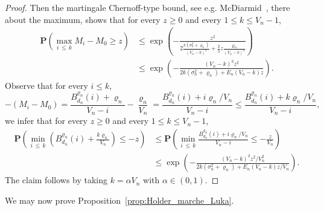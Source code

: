 \documentclass[AHL,Unicode,longabstracts,published]{cedram}
\newcommand{\ensembles}[1]{\mathbf{#1}}
\renewcommand{\P}{\ensembles{P}}
\renewcommand{\Pr}[1]{\P\left(#1\right)}
\newcommand{\1}{\ensembles{1}}
\renewcommand{\le}{\leqslant}
\renewcommand{\ge}{\geqslant}
\newcommand{\Bfn}{B_{d_n}^{\varrho_n}}
\newcommand{\edges}{E}
\newcommand{\vertices}{V}
\begin{document}
\begin{proof}
Then the martingale Chernoff-type bound, see e.g. McDiarmid~\cite[Theorem~3.15 and the remark at the end of Section~3.5]{McD98}, there about the maximum, shows that for every $z \ge 0$ and every $1 \le k \le \vertices_n-1$,
\begin{align*}
\Pr{\max_{i\,\le\,k} M_i - M_0 \ge z} &\le \exp\left(- \frac{z^2}{2 \frac{k \left(\sigma_n^2+\varrho_n\right)}{\left(\vertices_n - k\right)^3} + \frac{2}{3} z \frac{\edges_n}{\left(\vertices_n - k\right)^2}}\right)
\\
&\le \exp\left(- \frac{\left(\vertices_n - k\right)^3 z^2}{2k \left(\sigma_n^2+\varrho_n\right) + \edges_n (\vertices_n-k) z}\right).
\end{align*}
Observe that for every $i \le k$,
\[
- \left(M_i - M_0\right) = \frac{\Bfn(i) + \varrho_n}{\vertices_n-i} - \frac{\varrho_n}{\vertices_n} = \frac{\Bfn(i) + i \varrho_n / \vertices_n}{\vertices_n-i}
\le \frac{\Bfn(i) + k \varrho_n / \vertices_n}{\vertices_n-i},
\]
we infer that for every $z \ge 0$ and every $1 \le k \le \vertices_n-1$,
\begin{align*}
\Pr{\min_{i\,\le\,k} \left(\Bfn(i) + \frac{k \varrho_n}{\vertices_n}\right) \le - z} &\le \Pr{\min_{i\,\le\,k} \frac{\Bfn(i) + i \varrho_n / \vertices_n}{\vertices_n-i} \le - \frac{z}{\vertices_n}}
\\
&\le \exp\left(- \frac{\left(\vertices_n - k\right)^3 z^2 / \vertices_n^2}{2k \left(\sigma_n^2+\varrho_n\right) + \edges_n \left(\vertices_n-k\right) z / \vertices_n}\right).
\end{align*}
The claim follows by taking $k = \alpha \vertices_n$ with $\alpha \in (0,1)$.
\end{proof}



We may now prove Proposition~\ref{prop:Holder_marche_Luka}.
\end{document}
